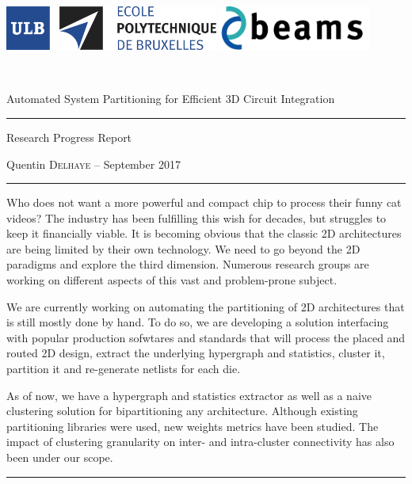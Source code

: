 \documentclass[11pt,a4paper]{report} %
\theoremstyle{customdef}
\renewenvironment{abstract}{%
\begin{center}\begin{minipage}{0.85\textwidth}
\rule{\textwidth}{1pt}}
{\par\noindent\rule{\textwidth}{1pt}\end{minipage}\end{center}}
\begin{document}
\begin{titlepage}
\begin{center}
\includegraphics[width=7cm]{img/logo-polytech-ULB-FR.jpg}
\includegraphics[width=5cm]{img/beams}
\end{center}
~\vspace{5cm}
\begin{center}
 {\LARGE Automated System Partitioning for Efficient 3D Circuit Integration \\ \vspace{.5em} \hrule \vspace{.5em} \Large Research Progress Report\\}
 \vspace{1.5cm}
 {\large Quentin \textsc{Delhaye} -- September 2017}\\[5pt]
 \vspace{3.5cm}

\begin{abstract}
Who does not want a more powerful and compact chip to process their funny cat videos?
The industry has been fulfilling this wish for decades, but struggles to keep it financially viable.
It is becoming obvious that the classic 2D architectures are being limited by their own technology.
We need to go beyond the 2D paradigms and explore the third dimension.
Numerous research groups are working on different aspects of this vast and problem-prone subject.

We are currently working on automating the partitioning of 2D architectures that is still mostly done by hand.
To do so, we are developing a solution interfacing with popular production sofwtares and standards that will process the placed and routed 2D design, extract the underlying hypergraph and statistics, cluster it, partition it and re-generate netlists for each die.

As of now, we have a hypergraph and statistics extractor as well as a naive clustering solution for bipartitioning any architecture.
Although existing partitioning libraries were used, new weights metrics have been studied.
The impact of clustering granularity on inter- and intra-cluster connectivity has also been under our scope.


\end{abstract}
\end{center}
\end{titlepage}
\end{document}

